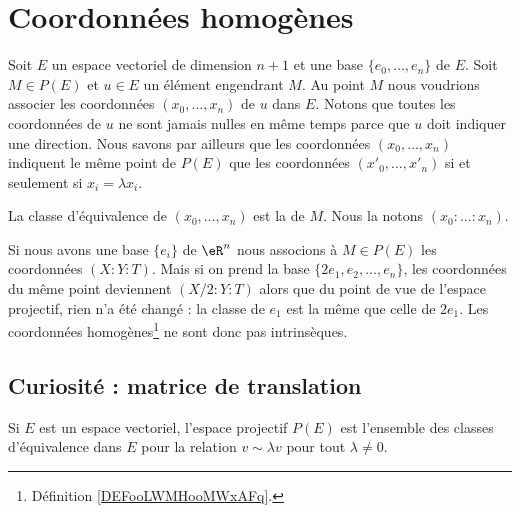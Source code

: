 \section{Coordonnées homogènes}

Soit \( E\) un espace vectoriel de dimension \( n+1\) et une base \( \{ e_0,\ldots, e_n \}\) de \( E\). Soit \( M\in P(E)\) et \( u\in E\) un élément engendrant \( M\). Au point \( M\) nous voudrions associer les coordonnées \( (x_0,\ldots, x_n)\) de \( u\) dans \( E\). Notons que toutes les coordonnées de \( u\) ne sont jamais nulles en même temps parce que \( u\) doit indiquer une direction. Nous savons par ailleurs que les coordonnées \( (x_0,\ldots, x_n)\) indiquent le même point de \( P(E)\) que les coordonnées \( (x'_0,\ldots, x'_n)\) si et seulement si \( x_i=\lambda x_i\).

\begin{definition}      \label{DEFooLWMHooMWxAFq}
	La classe d'équivalence de \( (x_0,\ldots, x_n)\) est la  de \( M\). Nous la notons \( (x_0:\ldots :x_n)\).
\end{definition}

Si nous avons une base \( \{ e_i \}\) de \( \eR^n\) nous associons à \( M\in P(E)\) les coordonnées \( (X:Y:T)\). Mais si on prend la base \( \{ 2e_1,e_2,\ldots, e_n \}\), les coordonnées du même point deviennent \( (X/2:Y:T)\) alors que du point de vue de l'espace projectif, rien n'a été changé : la classe de \( e_1\) est la même que celle de \( 2e_1\). Les coordonnées homogènes\footnote{Définition \ref{DEFooLWMHooMWxAFq}.} ne sont donc pas intrinsèques.

\subsection{Curiosité : matrice de translation}

Si \( E\) est un espace vectoriel, l'espace projectif \( P(E)\) est l'ensemble des classes d'équivalence dans \( E\) pour la relation \( v\sim \lambda v\) pour tout \( \lambda\neq 0\).

